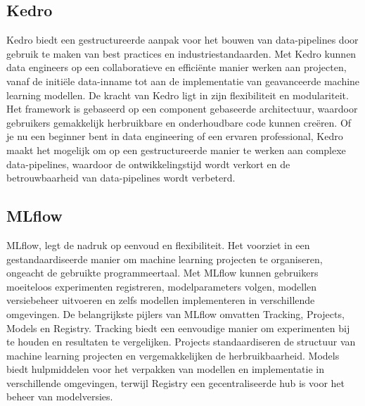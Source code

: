 \subsection{Kedro}
Kedro biedt een gestructureerde aanpak voor het bouwen van data-pipelines door gebruik te maken van best practices en industriestandaarden. Met Kedro kunnen data engineers op een collaboratieve en efficiënte manier werken aan projecten, vanaf de initiële data-inname tot aan de implementatie van geavanceerde machine learning modellen.
De kracht van Kedro ligt in zijn flexibiliteit en modulariteit. Het framework is gebaseerd op een component gebaseerde architectuur, waardoor gebruikers gemakkelijk herbruikbare en onderhoudbare code kunnen creëren. Of je nu een beginner bent in data engineering of een ervaren professional, Kedro maakt het mogelijk om op een gestructureerde manier te werken aan complexe data-pipelines, waardoor de ontwikkelingstijd wordt verkort en de betrouwbaarheid van data-pipelines wordt verbeterd.
\subsection{MLflow}
MLflow, legt de nadruk op eenvoud en flexibiliteit. Het voorziet in een gestandaardiseerde manier om machine learning projecten te organiseren, ongeacht de gebruikte programmeertaal. Met MLflow kunnen gebruikers moeiteloos experimenten registreren, modelparameters volgen, modellen versiebeheer uitvoeren en zelfs modellen implementeren in verschillende omgevingen.
De belangrijkste pijlers van MLflow omvatten Tracking, Projects, Models en Registry. Tracking biedt een eenvoudige manier om experimenten bij te houden en resultaten te vergelijken.
Projects standaardiseren de structuur van machine learning projecten en vergemakkelijken de herbruikbaarheid.
Models biedt hulpmiddelen voor het verpakken van modellen en implementatie in verschillende omgevingen, terwijl Registry een gecentraliseerde hub is voor het beheer van modelversies.



